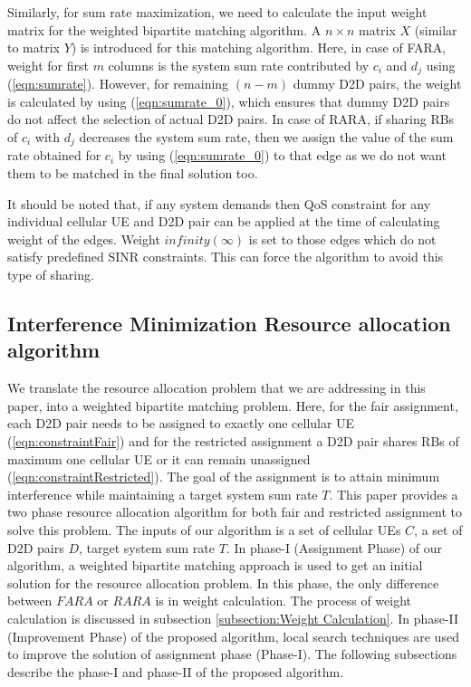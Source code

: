 \documentclass{ieeeaccess}
\begin{document}
\smallskip
 
Similarly, for sum rate maximization, we need to calculate the input weight matrix for the weighted bipartite matching algorithm. A $n \times n$ matrix $X$ (similar to matrix $Y$) is introduced for this matching algorithm. Here, in case of FARA, weight for first $m$ columns is the system sum rate contributed by $c_i$ and $d_j$ using (\ref{eqn:sumrate}). However, for remaining $(n-m)$ dummy D2D pairs, the weight is calculated by using (\ref{eqn:sumrate_0}), which ensures that dummy D2D pairs do not affect the selection of actual D2D pairs. In case of RARA, if sharing RBs of $c_i$ with $d_j$ decreases the system sum rate, then we assign the value of the sum rate obtained for $c_i$ by using (\ref{eqn:sumrate_0}) to that edge as we do not want them to be matched in the final solution too.

\smallskip

It should be noted that, if any system demands then QoS constraint for any individual cellular UE and D2D pair can be applied at the time of calculating weight of the edges. Weight $infinity (\infty)$ is set to those edges which do not satisfy predefined SINR constraints. This can force the algorithm to avoid this type of sharing.
  
\subsection{Interference Minimization Resource allocation algorithm}\label{section:FairAssignment}
\smallskip
 
We translate the resource allocation problem that we are addressing in this paper, into a weighted bipartite matching problem. Here, for the fair assignment, each D2D pair needs to be assigned to exactly one cellular UE (\ref{eqn:constraintFair}) and for the restricted assignment a D2D pair shares RBs of maximum one cellular UE or it can remain unassigned (\ref{eqn:constraintRestricted}). The goal of the assignment is to attain minimum interference while maintaining a target system sum rate $T$. This paper provides a two phase resource allocation algorithm for both fair and restricted assignment to solve this problem. The inputs of our algorithm is a set of cellular UEs $C$, a set of D2D pairs $D$, target system sum rate $T$. In phase-I (Assignment Phase) of our algorithm, a weighted bipartite matching approach is used to get an initial solution for the resource allocation problem. In this phase,  the only difference between $FARA$ or $RARA$  is in weight calculation. The process of weight calculation is discussed in subsection \ref{subsection:Weight Calculation}. In phase-II (Improvement Phase) of the proposed algorithm, local search techniques are used to improve the solution of assignment phase (Phase-I). The following subsections describe the phase-I and phase-II of the proposed algorithm. 
\end{document}
